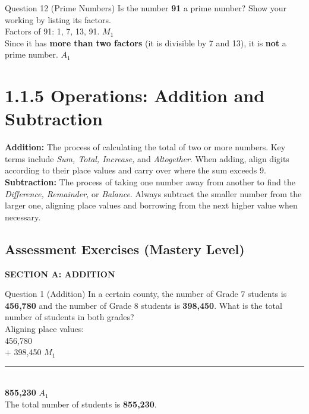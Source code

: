 \documentclass[12pt, a4paper, oneside]{article}
\begin{document}
\begin{solvingbox}{Question 12 (Prime Numbers)}
Is the number \textbf{91} a prime number? Show your working by listing its factors. \\
Factors of 91: 1, 7, 13, 91. \hfill $M_1$ \\
Since it has \textbf{more than two factors} (it is divisible by 7 and 13), it is \textbf{not} a prime number. \hfill $A_1$
\end{solvingbox}

\section*{1.1.5 Operations: Addition and Subtraction}

\begin{tcolorbox}[colback=lightgrey, colframe=primaryblue, title=\textbf{Concept Summary}, arc=5pt]
    \textbf{Addition:} The process of calculating the total of two or more numbers. Key terms include \textit{Sum, Total, Increase,} and \textit{Altogether}. When adding, align digits according to their place values and carry over where the sum exceeds 9. \\
    
    \textbf{Subtraction:} The process of taking one number away from another to find the \textit{Difference, Remainder,} or \textit{Balance}. Always subtract the smaller number from the larger one, aligning place values and borrowing from the next higher value when necessary.
\end{tcolorbox}

\subsection*{Assessment Exercises (Mastery Level)}

\begin{center}
    \textbf{\color{strandcolor} SECTION A: ADDITION}
\end{center}

\begin{solvingbox}{Question 1 (Addition)}
In a certain county, the number of Grade 7 students is \textbf{456,780} and the number of Grade 8 students is \textbf{398,450}. What is the total number of students in both grades? \\
Aligning place values: \\
\phantom{+} 456,780 \\
+ 398,450 \hfill $M_1$ \\
\rule{2.5cm}{0.4pt} \\
\textbf{855,230} \hfill $A_1$ \\
The total number of students is \textbf{855,230}.
\end{solvingbox}
\end{document}

